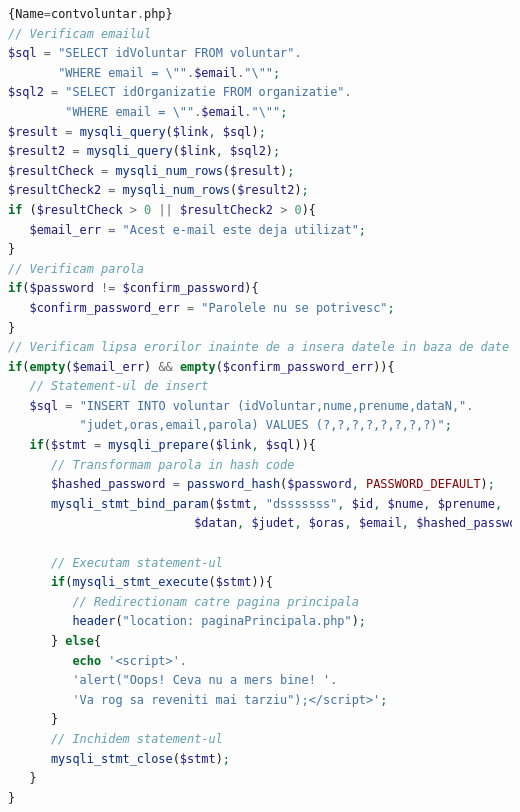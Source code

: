 \documentclass[12pt,a4paper]{report}
\begin{document}
\begin{lstlisting}[basicstyle=\small, language=PHP]{Name=contvoluntar.php}
// Verificam emailul
$sql = "SELECT idVoluntar FROM voluntar".
       "WHERE email = \"".$email."\"";
$sql2 = "SELECT idOrganizatie FROM organizatie".
        "WHERE email = \"".$email."\"";
$result = mysqli_query($link, $sql);
$result2 = mysqli_query($link, $sql2);
$resultCheck = mysqli_num_rows($result);
$resultCheck2 = mysqli_num_rows($result2);
if ($resultCheck > 0 || $resultCheck2 > 0){
   $email_err = "Acest e-mail este deja utilizat";
}
// Verificam parola
if($password != $confirm_password){
   $confirm_password_err = "Parolele nu se potrivesc";
}
// Verificam lipsa erorilor inainte de a insera datele in baza de date
if(empty($email_err) && empty($confirm_password_err)){
   // Statement-ul de insert
   $sql = "INSERT INTO voluntar (idVoluntar,nume,prenume,dataN,".
          "judet,oras,email,parola) VALUES (?,?,?,?,?,?,?,?)";
   if($stmt = mysqli_prepare($link, $sql)){
      // Transformam parola in hash code
      $hashed_password = password_hash($password, PASSWORD_DEFAULT); 
      mysqli_stmt_bind_param($stmt, "dsssssss", $id, $nume, $prenume,
                          $datan, $judet, $oras, $email, $hashed_password);

      // Executam statement-ul
      if(mysqli_stmt_execute($stmt)){
         // Redirectionam catre pagina principala
         header("location: paginaPrincipala.php");
      } else{
         echo '<script>'.
         'alert("Oops! Ceva nu a mers bine! '.
         'Va rog sa reveniti mai tarziu");</script>';
      }
      // Inchidem statement-ul
      mysqli_stmt_close($stmt);
   }
}
\end{lstlisting}
\end{document}
